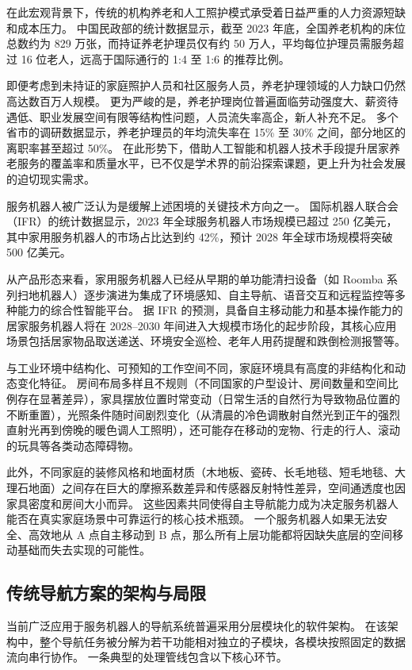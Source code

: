 \documentclass[12pt,a4paper]{ctexart}
\begin{document}
在此宏观背景下，传统的机构养老和人工照护模式承受着日益严重的人力资源短缺和成本压力。
中国民政部的统计数据显示，截至 2023 年底，全国养老机构的床位总数约为 829 万张，而持证养老护理员仅有约 50 万人，平均每位护理员需服务超过 16 位老人，远高于国际通行的 1:4 至 1:6 的推荐比例。

即便考虑到未持证的家庭照护人员和社区服务人员，养老护理领域的人力缺口仍然高达数百万人规模。
更为严峻的是，养老护理岗位普遍面临劳动强度大、薪资待遇低、职业发展空间有限等结构性问题，人员流失率高企，新人补充不足。
多个省市的调研数据显示，养老护理员的年均流失率在 15\% 至 30\% 之间，部分地区的离职率甚至超过 50\%。
在此形势下，借助人工智能和机器人技术手段提升居家养老服务的覆盖率和质量水平，已不仅是学术界的前沿探索课题，更上升为社会发展的迫切现实需求。

服务机器人被广泛认为是缓解上述困境的关键技术方向之一。
国际机器人联合会（IFR）的统计数据显示，2023 年全球服务机器人市场规模已超过 250 亿美元，其中家用服务机器人的市场占比达到约 42\%，预计 2028 年全球市场规模将突破 500 亿美元。

从产品形态来看，家用服务机器人已经从早期的单功能清扫设备（如 Roomba 系列扫地机器人）逐步演进为集成了环境感知、自主导航、语音交互和远程监控等多种能力的综合性智能平台。
据 IFR 的预测，具备自主移动能力和基本操作能力的居家服务机器人将在 2028--2030 年间进入大规模市场化的起步阶段，其核心应用场景包括居家物品取送递送、环境安全巡检、老年人用药提醒和跌倒检测报警等。

与工业环境中结构化、可预知的工作空间不同，家庭环境具有高度的非结构化和动态变化特征。
房间布局多样且不规则（不同国家的户型设计、房间数量和空间比例存在显著差异），家具摆放位置时常变动（日常生活的自然行为导致物品位置的不断重置），光照条件随时间剧烈变化（从清晨的冷色调散射自然光到正午的强烈直射光再到傍晚的暖色调人工照明），还可能存在移动的宠物、行走的行人、滚动的玩具等各类动态障碍物。

此外，不同家庭的装修风格和地面材质（木地板、瓷砖、长毛地毯、短毛地毯、大理石地面）之间存在巨大的摩擦系数差异和传感器反射特性差异，空间通透度也因家具密度和房间大小而异。
这些因素共同使得自主导航能力成为决定服务机器人能否在真实家庭场景中可靠运行的核心技术瓶颈。
一个服务机器人如果无法安全、高效地从 A 点自主移动到 B 点，那么所有上层功能都将因缺失底层的空间移动基础而失去实现的可能性。

\subsection{传统导航方案的架构与局限}

当前广泛应用于服务机器人的导航系统普遍采用分层模块化的软件架构。
在该架构中，整个导航任务被分解为若干功能相对独立的子模块，各模块按照固定的数据流向串行协作。
一条典型的处理管线包含以下核心环节。
\end{document}
